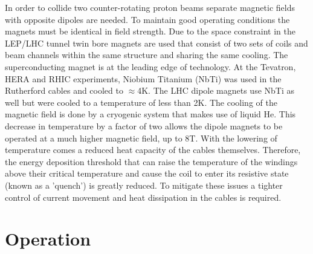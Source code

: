 In order to collide two counter-rotating proton beams separate magnetic fields
with opposite dipoles are needed. To maintain good operating conditions
the magnets must be identical in field strength. 
Due to the space constraint in the LEP/LHC
tunnel twin bore magnets are used that consist of two sets of 
coils and beam channels within the same structure and
sharing the same cooling. 
The superconducting magnet is at the leading edge of technology.
At the Tevatron, HERA and RHIC experiments, Niobium Titanium (NbTi)
was used in the Rutherford cables and cooled to $\approx$4K. 
The LHC dipole magnets use NbTi as well but were cooled
to a temperature of less than 2K. 
The cooling of the magnetic field is done%
by a cryogenic system that makes use of liquid He.
This decrease in temperature
by a factor of two allows the dipole magnets to be operated 
at a much higher magnetic field, up to 8T. With the lowering of
temperature comes a reduced heat capacity of the cables themselves.
Therefore, the energy deposition threshold that can raise the 
temperature of the windings above their critical temperature and
cause the coil to enter its resistive state (known as a 'quench') is greatly
reduced. To mitigate these issues a tighter control of current movement
and heat dissipation in the cables is required. 

\section{Operation}

